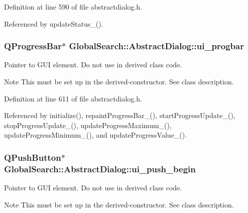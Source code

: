 Definition at line 590 of file abstractdialog.\+h.



Referenced by update\+Status\+\_\+().

\hypertarget{classGlobalSearch_1_1AbstractDialog_a9b91400d03e9c7f3e94bf6b1f91bb97a}{}
\subsubsection[{ui\+\_\+progbar}]{\setlength{\rightskip}{0pt plus 5cm}Q\+Progress\+Bar$\ast$ Global\+Search\+::\+Abstract\+Dialog\+::ui\+\_\+progbar\hspace{0.3cm}{\ttfamily [protected]}}\label{classGlobalSearch_1_1AbstractDialog_a9b91400d03e9c7f3e94bf6b1f91bb97a}
Pointer to G\+U\+I element. Do not use in derived class code. \begin{DoxyNote}{Note}
This must be set up in the derived-\/constructor. See class description. 
\end{DoxyNote}


Definition at line 611 of file abstractdialog.\+h.



Referenced by initialize(), repaint\+Progress\+Bar\+\_\+(), start\+Progress\+Update\+\_\+(), stop\+Progress\+Update\+\_\+(), update\+Progress\+Maximum\+\_\+(), update\+Progress\+Minimum\+\_\+(), and update\+Progress\+Value\+\_\+().

\hypertarget{classGlobalSearch_1_1AbstractDialog_a526c9ad4ea52454ba41be74de24cdd6c}{}
\subsubsection[{ui\+\_\+push\+\_\+begin}]{\setlength{\rightskip}{0pt plus 5cm}Q\+Push\+Button$\ast$ Global\+Search\+::\+Abstract\+Dialog\+::ui\+\_\+push\+\_\+begin\hspace{0.3cm}{\ttfamily [protected]}}\label{classGlobalSearch_1_1AbstractDialog_a526c9ad4ea52454ba41be74de24cdd6c}
Pointer to G\+U\+I element. Do not use in derived class code. \begin{DoxyNote}{Note}
This must be set up in the derived-\/constructor. See class description. 
\end{DoxyNote}


